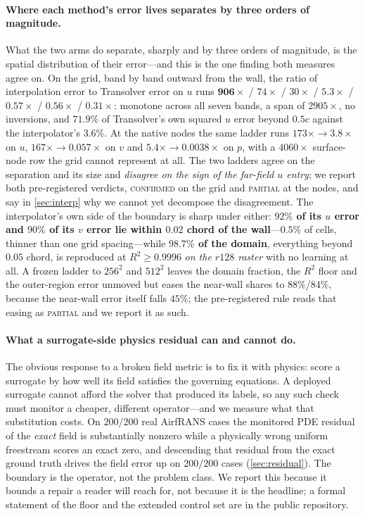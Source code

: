 \paragraph{Where each method's error lives separates by three orders of magnitude.} What the two arms
do separate, sharply and by three orders of magnitude, is the spatial distribution of their
error---and this is the one finding both measures agree on. On the grid, band by band
outward from the wall, the ratio of interpolation error to Transolver error on $u$ runs
$\mathbf{906\times}$ / $74\times$ / $30\times$ / $5.3\times$ / $0.57\times$ / $0.56\times$
/ $\mathbf{0.31\times}$: monotone across all seven bands, a span of $2905\times$, no
inversions, and $71.9\%$ of Transolver's own squared $u$ error beyond $0.5c$ against the
interpolator's $3.6\%$. At the native nodes the same ladder runs $173\times \to 3.8\times$
on $u$, $167\times \to 0.057\times$ on $v$ and $5.4\times \to 0.0038\times$ on $p$, with a
$4060\times$ surface-node row the grid cannot represent at all. The two ladders agree on
the separation and its size and \emph{disagree on the sign of the far-field $u$ entry}; we
report both pre-registered verdicts, \textsc{confirmed} on the grid and \textsc{partial} at
the nodes, and say in \autoref{sec:interp} why we cannot yet decompose the disagreement.
The interpolator's own side of the boundary is sharp under either: \textbf{$92\%$ of its
$u$ error and $90\%$ of its $v$ error lie within $0.02$ chord of the wall}---$0.5\%$ of
cells, thinner than one grid spacing---while \textbf{$98.7\%$ of the domain}, everything
beyond $0.05$ chord, is reproduced at $R^2\ge0.9996$ \emph{on the $r128$ raster} with no
learning at all. A frozen
ladder to $256^2$ and $512^2$ leaves the domain fraction, the $R^2$ floor and the
outer-region error unmoved but eases the near-wall shares to $88\%$/$84\%$, because the
near-wall error itself falls $45\%$; the pre-registered rule reads that easing as
\textsc{partial} and we report it as such.

\paragraph{What a surrogate-side physics residual can and cannot do.} The obvious response
to a broken field metric is to fix it with physics: score a surrogate by how well its field
satisfies the governing equations. A deployed surrogate cannot afford the solver that
produced its labels, so any such check must monitor a cheaper, different operator---and we
measure what that substitution costs. On $200/200$ real AirfRANS cases the monitored PDE
residual of the \emph{exact} field is substantially nonzero while a physically wrong
uniform freestream scores an exact zero, and descending that residual from the exact ground
truth drives the field error up on $200/200$ cases (\autoref{sec:residual}). The boundary
is the operator, not the problem class. We report this because it bounds a repair a reader
will reach for, not because it is the headline; a formal statement of the floor and the
extended control set are in the public repository.

